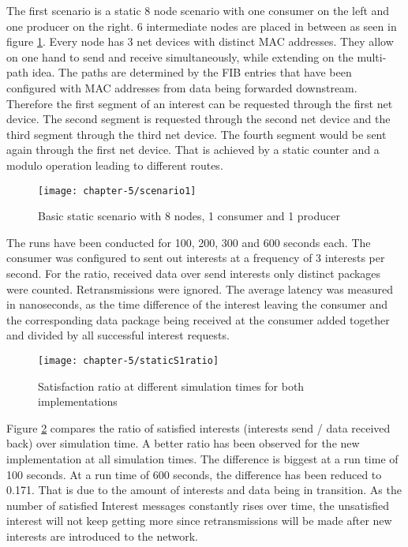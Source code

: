 The first scenario is a static 8 node scenario with one consumer on the left and one producer on the right. 6 intermediate nodes are placed in between as seen in figure \ref{fig:scenario1}. Every node has 3 net devices with distinct MAC addresses. They allow on one hand to send and receive simultaneously, while extending on the multi-path idea. The paths are determined by the FIB entries that have been configured with MAC addresses from data being forwarded downstream. Therefore the first segment of an interest can be requested through the first net device. The second segment is requested through the second net device and the third segment through the third net device. The fourth segment would be sent again through the first net device. That is achieved by a static counter and a modulo operation leading to different routes.

\vspace{5mm} %

\begin{figure}[H]
  \centering
  \texttt{[image: chapter-5/scenario1]}
  \caption{Basic static scenario with 8 nodes, 1 consumer and 1 producer}
  \label{fig:scenario1}
\end{figure}

\vspace{5mm} %

The runs have been conducted for 100, 200, 300 and 600 seconds each. The consumer was configured to sent out interests at a frequency of 3 interests per second. For the ratio, received data over send interests only distinct packages were counted. Retransmissions were ignored. The average latency was measured in nanoseconds, as the time difference of the interest leaving the consumer and the corresponding data package being received at the consumer added together and divided by all successful interest requests.

\vspace{5mm} %

\begin{figure}[H]
  \centering
  \texttt{[image: chapter-5/staticS1ratio]}
  \caption{Satisfaction ratio at different simulation times for both implementations}
  \label{fig:staticS1ratio}
\end{figure}

\vspace{5mm} %

Figure \ref{fig:staticS1ratio} compares the ratio of satisfied interests (interests send / data received back) over simulation time. A better ratio has been observed for the new implementation at all simulation times. The difference is biggest at a run time of 100 seconds. At a run time of 600 seconds, the difference has been reduced to 0.171. That is due to the amount of interests and data being in transition. As the number of satisfied Interest messages constantly rises over time, the unsatisfied interest will not keep getting more since retransmissions will be made after new interests are introduced to the network.


